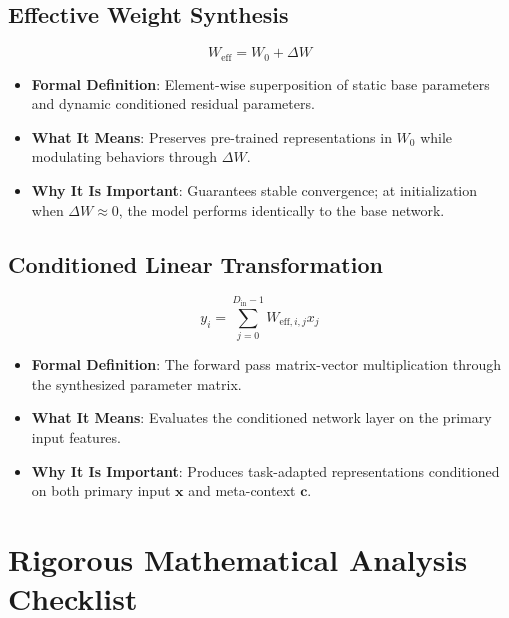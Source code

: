 \documentclass[11pt,a4paper]{article}
\theoremstyle{definition}
\begin{document}
\subsection{Effective Weight Synthesis}
{\boldmath
\begin{equation}
W_{\text{eff}} = W_0 + \Delta W
\end{equation}
}
\begin{itemize}
    \item \textbf{Formal Definition}: Element-wise superposition of static base parameters and dynamic conditioned residual parameters.
    \item \textbf{What It Means}: Preserves pre-trained representations in $W_0$ while modulating behaviors through $\Delta W$.
    \item \textbf{Why It Is Important}: Guarantees stable convergence; at initialization when $\Delta W \approx 0$, the model performs identically to the base network.
\end{itemize}

\subsection{Conditioned Linear Transformation}
{\boldmath
\begin{equation}
y_i = \sum_{j=0}^{D_{\text{in}}-1} W_{\text{eff}, i, j} x_j
\end{equation}
}
\begin{itemize}
    \item \textbf{Formal Definition}: The forward pass matrix-vector multiplication through the synthesized parameter matrix.
    \item \textbf{What It Means}: Evaluates the conditioned network layer on the primary input features.
    \item \textbf{Why It Is Important}: Produces task-adapted representations conditioned on both primary input $\mathbf{x}$ and meta-context $\mathbf{c}$.
\end{itemize}

\section{Rigorous Mathematical Analysis Checklist}
\end{document}
